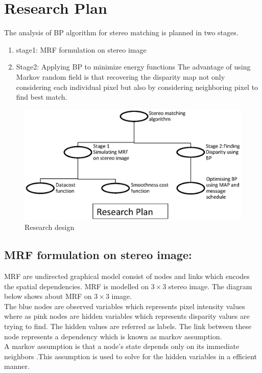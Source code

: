 \chapter{Research Plan}
\label{Chapter Research Design}
The analysis of BP algorithm for stereo matching is planned in two stages.

 \begin{enumerate}
   \item stage1: MRF formulation on stereo image
   \item Stage2: Applying  BP to minimize energy functions
The advantage of using Markov random field is that recovering the disparity map not only considering each individual pixel but also by considering neighboring pixel to find best match.
 \end{enumerate}


\begin{figure}
  \includegraphics{rp1.eps}
  \caption{Research design } \label{rp}
\end{figure}





\section{MRF formulation on stereo image:}

MRF are undirected graphical model consist of nodes and links which encodes the spatial dependencies.
MRF is modelled on $3 \times3$ stereo image.
The diagram below shows about  MRF on $3\times3$ image.
\\The  blue nodes are observed variables which represents pixel intensity values where as pink nodes are hidden variables which represents disparity values are trying to find. The hidden values are referred as  labels.
The link between these node represents a dependency which is known as markov assumption.
\\A markov  assumption is that a node's state depends only on its immediate   neighbors .This assumption is used to  solve for the hidden  variables in a efficient manner.

